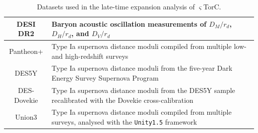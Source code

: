 \documentclass[aps,prd,reprint,preprintnumbers,showpacs,floatfix,nofootinbib,superscriptaddress]{revtex4-2}
\begin{document}
\begin{table}[t]
\centering
\begin{tabularx}{\columnwidth}{c|>{\raggedright\arraybackslash}X}
\toprule
DESI DR2 & Baryon acoustic oscillation measurements of $D_M/r_d$, $D_H/r_d$, and $D_V/r_d$~\citep{DESI:2025zgx,DESI:2025zpo} \\
\midrule
Pantheon+ & Type Ia supernova distance moduli compiled from multiple low- and high-redshift surveys~\citep{Scolnic:2021amr,Brout:2022vxf} \\
\midrule
DES5Y & Type Ia supernova distance moduli from the five-year Dark Energy Survey Supernova Program~\citep{DES:2024jxu,DES:2024hip} \\
\midrule
DES-Dovekie & Type Ia supernova distance moduli from the DES5Y sample recalibrated with the Dovekie cross-calibration~\citep{Popovic:2025glk,Popovic:2025DESDovekie} \\
\midrule
Union3 & Type Ia supernova distance moduli compiled from multiple surveys, analysed with the \texttt{Unity1.5} framework~\citep{Rubin:2023ovl} \\
\bottomrule
\end{tabularx}
\caption{Datasets used in the late-time expansion analysis of $\varsigma$TorC.}
\label{tab:stigma-data}
\end{table}
\end{document}
